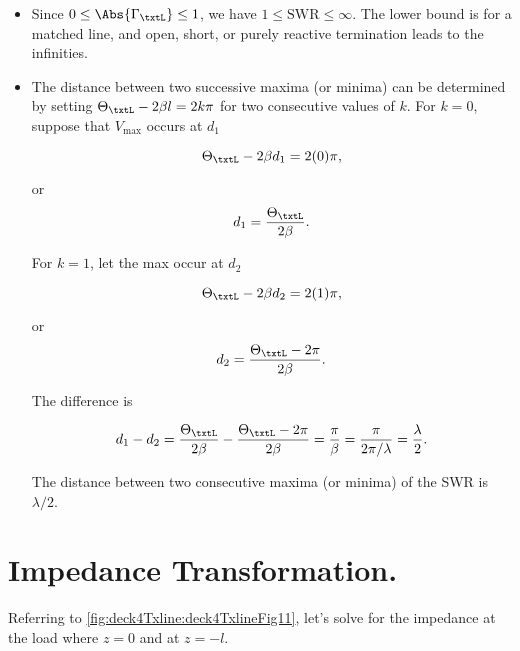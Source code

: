 \begin{itemize}
\item Since \( 0 \le \Abs{\Gamma_\txtL} \le 1 \), we have \( 1 \le \textrm{SWR} \le \infty \).  The lower bound is for a matched line, and open, short, or purely reactive termination leads to the infinities.
\item The distance between two successive maxima (or minima) can be determined by setting \( \Theta_\txtL - 2 \beta l = 2 k \pi \) for two consecutive values of \( k \).  For \( k = 0 \), suppose that \( V_{\mathrm{max}} \) occurs at \( d_1 \)

\begin{dmath}\label{eqn:uwaves4TransmissionLines:1220}
\Theta_\txtL - 2 \beta d_1 = 2 (0) \pi,
\end{dmath}

or
\begin{dmath}\label{eqn:uwaves4TransmissionLines:1240}
d_1 = \frac{\Theta_\txtL}{2 \beta}.
\end{dmath}

For \( k = 1 \), let the max occur at \( d_2 \)

\begin{dmath}\label{eqn:uwaves4TransmissionLines:1260}
\Theta_\txtL - 2 \beta d_2 = 2 (1) \pi,
\end{dmath}

or
\begin{dmath}\label{eqn:uwaves4TransmissionLines:1280}
d_2 = \frac{\Theta_\txtL - 2 \pi}{2 \beta}.
\end{dmath}

The difference is

\begin{dmath}\label{eqn:uwaves4TransmissionLines:1300}
d_1 - d_2 
= \frac{\Theta_\txtL}{2 \beta} - \frac{\Theta_\txtL - 2 \pi}{2 \beta} 
= \frac{\pi}{\beta}
= \frac{\pi}{2 \pi/\lambda}
= \frac{\lambda}{2}.
\end{dmath}

The distance between two consecutive maxima (or minima) of the SWR is \( \lambda/2 \).

\end{itemize}

\section{Impedance Transformation.}

Referring to \cref{fig:deck4Txline:deck4TxlineFig11}, let's solve for the impedance at the load where \( z = 0 \) and at \( z = -l \).

